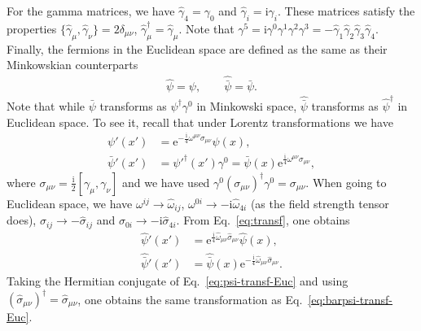 \documentclass[review]{elsarticle}
\numberwithin{equation}{section}
\numberwithin{table}{section}
\numberwithin{figure}{section}
\def\i{\mathrm{i}}
\def\e{\mathrm{e}}
\begin{document}
For the gamma matrices, we have $\hat{\gamma}_4=\gamma_0$ and $\hat{\gamma}_i=\i\gamma_i$. These matrices satisfy the properties $\{\hat{\gamma}_\mu,\hat{\gamma}_\nu\}=2\delta_{\mu\nu}$, $\hat{\gamma}_{\mu}^{\dagger}=\hat{\gamma}_\mu$. Note that $\gamma^5=\i\gamma^0\gamma^1\gamma^2\gamma^3=-\hat{\gamma}_1\hat{\gamma}_2\hat{\gamma}_3\hat{\gamma}_4$. Finally, the fermions in the Euclidean space are defined as the same as their Minkowskian counterparts
\begin{align}
    \hat{\psi} = \psi,
    \qquad 
    \hat{\bar{\psi}} = \bar{\psi}.
\end{align}
Note that while $\bar{\psi}$ transforms as $\psi^\dagger\gamma^0$ in Minkowski space, $\hat{\bar{\psi}}$ transforms as $\hat{\psi}^\dagger$ in Euclidean space.  To see it, recall that under Lorentz transformations we have 
\begin{subequations}
\begin{align}
    \psi'(x') &= \e^{-\frac{\i}{4}\omega^{\mu\nu}\sigma_{\mu\nu}}\psi(x),
    \label{eq:psi-transf}\\
    \bar{\psi}'(x') &= \psi'^\dagger(x')\gamma^0=\bar{\psi}(x)\e^{\frac{\i}{4}\omega^{\mu\nu}\sigma_{\mu\nu}},
    \label{eq:barpsi-transf}
\end{align}
\label{eq:transf}
\end{subequations}
where $\sigma_{\mu\nu}=\frac{\i}{2} [\gamma_\mu,\gamma_\nu]$ and we have used $\gamma^0\left(\sigma_{\mu\nu}\right)^\dagger\gamma^0=\sigma_{\mu\nu}$. When going to Euclidean space, we have $\omega^{ij}\rightarrow \hat{\omega}_{ij}$, $\omega^{0i}\rightarrow -\i\hat{\omega}_{4i}$ (as the field strength tensor does), $\sigma_{ij}\rightarrow -\hat{\sigma}_{ij}$ and $\sigma_{0i}\rightarrow -\i\hat{\sigma}_{4i}$. From Eq.~\eqref{eq:transf}, one obtains
\begin{subequations}
\begin{align}
    \hat{\psi}'(x') &= \e^{\frac{\i}{4}\hat{\omega}_{\mu\nu}\hat{\sigma}_{\mu\nu}}\hat{\psi}(x),
    \label{eq:psi-transf-Euc}\\
    \hat{\bar{\psi}}'(x') &= \hat{\bar{\psi}}(x)\e^{-\frac{\i}{4}\hat{\omega}_{\mu\nu}\hat{\sigma}_{\mu\nu}}.
    \label{eq:barpsi-transf-Euc}
\end{align}
\end{subequations}
Taking the Hermitian conjugate of Eq.~\eqref{eq:psi-transf-Euc} and using $\left(\hat{\sigma}_{\mu\nu}\right)^\dagger=\hat{\sigma}_{\mu\nu}$, one obtains the same transformation as Eq.~\eqref{eq:barpsi-transf-Euc}.
\end{document}
